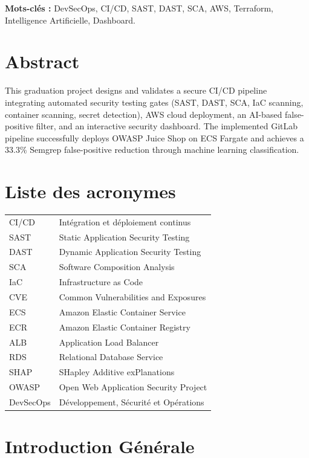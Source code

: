 \documentclass[12pt,a4paper]{report}
\begin{document}
\textbf{Mots-clés :} DevSecOps, CI/CD, SAST, DAST, SCA, AWS, Terraform, Intelligence Artificielle, Dashboard.

\chapter*{Abstract}
This graduation project designs and validates a secure CI/CD pipeline integrating automated security testing gates (SAST, DAST, SCA, IaC scanning, container scanning, secret detection), AWS cloud deployment, an AI-based false-positive filter, and an interactive security dashboard. The implemented GitLab pipeline successfully deploys OWASP Juice Shop on ECS Fargate and achieves a 33.3\% Semgrep false-positive reduction through machine learning classification.

\chapter*{Liste des acronymes}
\begin{longtable}{@{}p{3cm}p{11cm}@{}}
    CI/CD & Intégration et déploiement continus \\
    SAST & Static Application Security Testing \\
    DAST & Dynamic Application Security Testing \\
    SCA & Software Composition Analysis \\
    IaC & Infrastructure as Code \\
    CVE & Common Vulnerabilities and Exposures \\
    ECS & Amazon Elastic Container Service \\
    ECR & Amazon Elastic Container Registry \\
    ALB & Application Load Balancer \\
    RDS & Relational Database Service \\
    SHAP & SHapley Additive exPlanations \\
    OWASP & Open Web Application Security Project \\
    DevSecOps & Développement, Sécurité et Opérations \\
\end{longtable}

\tableofcontents
\listoffigures
\listoftables
\newpage

\chapter{Introduction Générale}
\end{document}

